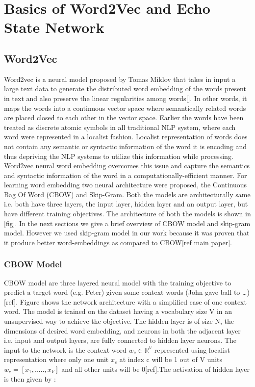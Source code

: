 \chapter{Basics of Word2Vec and Echo State Network}\label{basics}

\section{Word2Vec}
Word2vec is a neural model proposed by Tomas Miklov that takes in input a large text data to generate the distributed word  embedding of the words present in text and also preserve the linear regularities among words[]. In other words, it maps the words into a continuous vector space where semantically related words are placed closed to each other in the vector space. Earlier the words have been treated as discrete atomic symbols in all traditional NLP system, where each word were represented in a localist fashion. Localist representation of words does not contain any semantic or syntactic information of the word it is encoding and thus depriving the NLP systems to utilize this information while processing. Word2vec neural word embedding overcomes this issue and capture the semantics and syntactic information of the word in a computationally-efficient manner. For learning word embedding two neural architecture were proposed, the Continuous Bag Of Word (CBOW) and Skip-Gram. Both the models are architecturally same i.e. both have three layers, the input layer, hidden layer and an output layer, but have different training objectives. The architecture of both the models is shown in [fig]. In the next sections we give a brief overview of  CBOW model and skip-gram model. However we used skip-gram model in our work because it was proven that it produce better word-embeddings as compared to CBOW[ref main paper].

\subsection{CBOW Model}

CBOW  model are three layered neural model with the training objective to predict a target word (e.g. Peter) given some context words (John gave ball to …)[ref]. Figure  shows the network architecture with a simplified case of one context word. The model is trained on the dataset having a vocabulary size V in an unsupervised way to achieve the objective. The hidden layer is of size N, the dimensions of desired word embedding, and neurons in both the adjacent layer i.e.  input and output layers,  are fully connected to hidden layer neurons. The input to the network is the context word $w_c {\in} \mathbb{R}^{V}$ represented using localist representation where only one unit $x_c$ at index c will be 1 out of V units $w_c=[{x_1,.....,x_V}]$ and all other units will be 0[ref].The activation of hidden layer is then given by :

